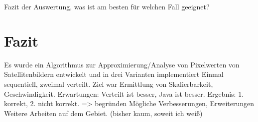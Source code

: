 Fazit der Auswertung, was ist am besten für welchen Fall geeignet?

\chapter{Fazit}
Es wurde ein Algorithmus zur Approximierung/Analyse von Pixelwerten von Satellitenbildern entwickelt und in drei Varianten implementiert
Einmal sequentiell, zweimal verteilt. 
Ziel war Ermittlung von Skalierbarkeit, Geschwindigkeit.
Erwartungen: Verteilt ist besser, Java ist besser.
Ergebnis: 1. korrekt, 2. nicht korrekt. => begründen
Mögliche Verbesserungen, Erweiterungen
Weitere Arbeiten auf dem Gebiet. (bisher kaum, soweit ich weiß)